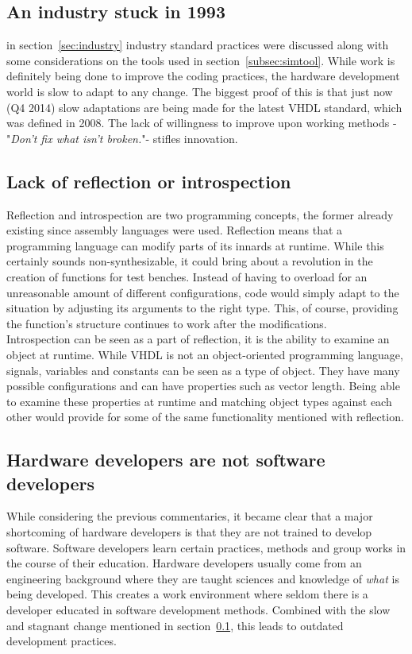\documentclass[11pt,british]{article}
\begin{document}
\subsection{An industry stuck in 1993}
\label{subsec:stuck}
in section~\ref{sec:industry} industry standard practices were discussed along with some considerations on the tools used in section~\ref{subsec:simtool}. While work is definitely being done to improve the coding practices, the hardware development world is slow to adapt to any change. The biggest proof of this is that just now (Q4 2014) slow adaptations are being made for the latest VHDL standard, which was defined in 2008. The lack of willingness to improve upon working methods -"\emph{Don't fix what isn't broken.}"- stifles innovation. 

\subsection{Lack of reflection or introspection}
Reflection and introspection are two programming concepts, the former already existing since assembly languages were used. Reflection means that a programming language can modify parts of its innards at runtime. While this certainly sounds non-synthesizable, it could bring about a revolution in the creation of functions for test benches. Instead of having to overload for an unreasonable amount of different configurations, code would simply adapt to the situation by adjusting its arguments to the right type. This, of course, providing the function's structure  continues to work after the modifications.
\\[\baselineskip]
Introspection can be seen as a part of reflection, it is the ability to examine an object at runtime. While VHDL is not an object-oriented programming language, signals, variables and constants can be seen as a type of object. They have many possible configurations and can have  properties such as vector length. Being able to examine these properties at runtime and matching object types against each other would provide for some of the same functionality mentioned with reflection.

\subsection{Hardware developers are not software developers}
While considering the previous commentaries, it became clear that a major shortcoming of hardware developers is that they are not trained to develop software. Software developers learn certain practices, methods and group works in the course of their education. Hardware developers usually come from an engineering background where  they are taught sciences and knowledge of \emph{what} is being developed. This creates a work environment where seldom there is a developer educated in software development methods. Combined with the slow and stagnant change mentioned in section~\ref{subsec:stuck}, this leads to outdated development practices.
\end{document}
